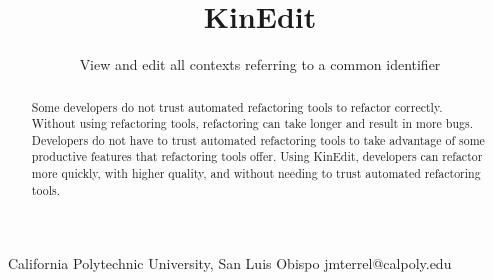 \documentclass{sigplanconf}
\begin{document}
\setlength{\pdfpageheight}{\paperheight}
\setlength{\pdfpagewidth}{\paperwidth}




\permissiontopublish             %


\newcommand{\pname}{KinEdit}

\title{\pname{}}
\subtitle{View and edit all contexts referring to a common identifier}

           {California Polytechnic University, San Luis Obispo}
           {jmterrel@calpoly.edu}

\maketitle

\begin{abstract}
Some developers do not trust automated refactoring tools to refactor correctly.
Without using refactoring tools, refactoring can take longer and result
in more bugs. Developers do not have to trust automated refactoring tools to
take advantage of some productive features that refactoring tools offer.
Using \pname{}, developers can refactor more quickly, with higher
quality, and without needing to trust automated refactoring tools.
\end{abstract}


\end{document}
